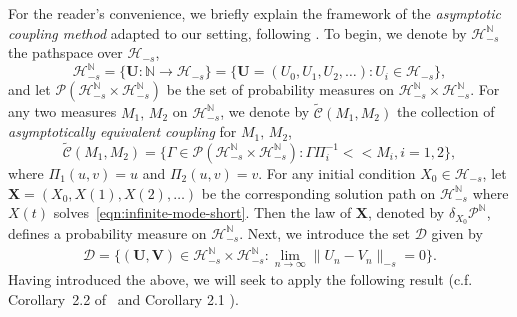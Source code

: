 \documentclass[11pt]{amsart}
\theoremstyle{definition}
\newcommand{\nbb}{\mathbb{N}}
\newcommand{\PMarkov}{\mathcal{P}}
\newcommand{\Xbf}{\mathbf{X}}
\newcommand{\Ubf}{\mathbf{U}}
\newcommand{\Vbf}{\mathbf{V}}
\newcommand{\wt}[1]{ \widetilde{#1} }
\newcommand{\Hs}{\mathcal{H}_{-s}}
\theoremstyle{definition}
\theoremstyle{plain}
\numberwithin{equation}{section}
\begin{document}
For the reader's convenience, we briefly explain the framework of the \emph{asymptotic coupling method} adapted to our setting, following \cite{hairer2011asymptotic,glatt2017unique}. To begin, we denote by $\Hs^\nbb$ the pathspace over $\Hs$, 
\begin{displaymath}
\Hs^\nbb=\{\Ubf:\nbb\to\Hs\}=\{\Ubf = (U_0,U_1,U_2,\dots): U_i\in\Hs\},
\end{displaymath} 
and let $\PMarkov(\Hs^\nbb\times\Hs^\nbb)$ be the set of probability measures on $\Hs^\nbb\times\Hs^\nbb$. For any two measures $M_1,\, M_2$ on $\Hs^\nbb$, we denote by $\wt{\mathcal{C}}(M_1,M_2)$ the collection of \emph{asymptotically equivalent coupling} for $M_1,\, M_2$,
\begin{equation}
\wt{\mathcal{C}}(M_1,M_2)=\{\Gamma\in\PMarkov(\Hs^\nbb\times\Hs^\nbb):\Gamma\Pi_i^{-1}<<M_i,i=1,2\},
\end{equation}
 where $\Pi_1(u,v)=u$ and $\Pi_2(u,v)=v$. For any initial condition $X_0\in\Hs$, let $\Xbf = (X_0,X(1),X(2),\dots)$ be the corresponding solution path on $\Hs^\nbb$ where $X(t)$ solves~\eqref{eqn:infinite-mode-short}. Then the law of $\Xbf$, denoted by $\delta_{X_0}\PMarkov^\nbb$, defines a probability measure on $\Hs^\nbb$. Next, we introduce the set $\mathscr{D}$ given by
 \begin{align} \label{form:coupling:D}
 \mathscr{D}=\{(\Ubf,\Vbf)\in\Hs^\nbb\times\Hs^\nbb:\lim_{n\to\infty} \|U_n-V_n\|_{-s}=0  \}.
 \end{align}
Having introduced the above, we will seek to apply the following result (c.f. Corollary~2.2 of~\cite{hairer2011asymptotic} and Corollary 2.1 \cite{glatt2017unique}).
\end{document}
